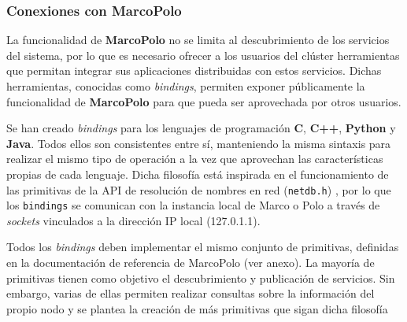\subsubsection{Conexiones con MarcoPolo}

La funcionalidad de \textbf{MarcoPolo} no se limita al descubrimiento de los servicios del sistema, por lo que es necesario ofrecer a los usuarios del clúster herramientas que permitan integrar sus aplicaciones distribuidas con estos servicios. Dichas herramientas, conocidas como \textit{bindings}, permiten exponer públicamente la funcionalidad de \textbf{MarcoPolo} para que pueda ser aprovechada por otros usuarios.

Se han creado \textit{bindings} para los lenguajes de programación \textbf{C}, \textbf{C++}, \textbf{Python} y \textbf{Java}. Todos ellos son consistentes entre sí, manteniendo la misma sintaxis para realizar el mismo tipo de operación a la vez que aprovechan las características propias de cada lenguaje. Dicha filosofía está inspirada en el funcionamiento de las primitivas de la API de resolución de nombres en red (\texttt{netdb.h}) \cite{netdb}, por lo que los \texttt{bindings} se comunican con la instancia local de Marco o Polo a través de \textit{sockets} vinculados a la dirección IP local (127.0.1.1).

Todos los \textit{bindings} deben implementar el mismo conjunto de primitivas, definidas en la documentación de referencia de MarcoPolo (ver anexo\citationneeded[TODO]). La mayoría de primitivas tienen como objetivo el descubrimiento y publicación de servicios. Sin embargo, varias de ellas permiten realizar consultas sobre la información del propio nodo y se plantea la creación de más primitivas que sigan dicha filosofía



